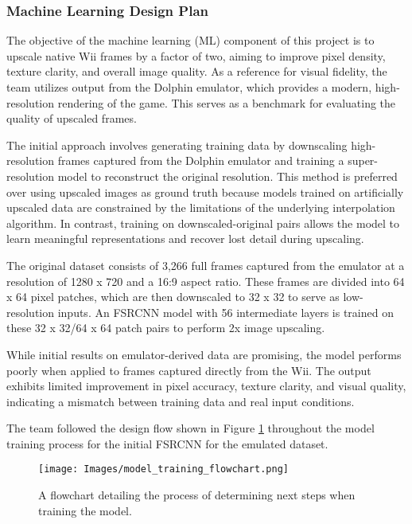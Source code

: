 \documentclass{article}
\begin{document}
        \subsubsection{Machine Learning Design Plan}
            \noindent The objective of the machine learning (ML) component of this project is to upscale native Wii frames by a factor of two, aiming to improve pixel density, texture clarity, and overall image quality. As a reference for visual fidelity, the team utilizes output from the Dolphin emulator, which provides a modern, high-resolution rendering of the game. This serves as a benchmark for evaluating the quality of upscaled frames.
            \par The initial approach involves generating training data by downscaling high-resolution frames captured from the Dolphin emulator and training a super-resolution model to reconstruct the original resolution. This method is preferred over using upscaled images as ground truth because models trained on artificially upscaled data are constrained by the limitations of the underlying interpolation algorithm. In contrast, training on downscaled-original pairs allows the model to learn meaningful representations and recover lost detail during upscaling.
            \par The original dataset consists of 3,266 full frames captured from the emulator at a resolution of 1280 x 720 and a 16:9 aspect ratio. These frames are divided into 64 x 64 pixel patches, which are then downscaled to 32 x 32 to serve as low-resolution inputs. An FSRCNN model with 56 intermediate layers is trained on these 32 x 32/64 x 64 patch pairs to perform 2x image upscaling.
            \par While initial results on emulator-derived data are promising, the model performs poorly when applied to frames captured directly from the Wii. The output exhibits limited improvement in pixel accuracy, texture clarity, and visual quality, indicating a mismatch between training data and real input conditions.
            \par The team followed the design flow shown in Figure \ref{fig:train_flowchart} throughout the model training process for the initial FSRCNN for the emulated dataset.
            \begin{figure}[!tb] 
                \centering
                \texttt{[image: Images/model\_training\_flowchart.png]} 
                \caption{A flowchart detailing the process of determining next steps when training the model.}
                \label{fig:train_flowchart} 
            \end{figure}
        
\end{document}
